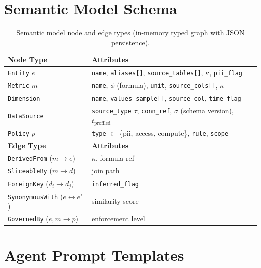\documentclass[11pt,a4paper]{article}
\begin{document}


\appendix

\section{Semantic Model Schema}\label{app:schema}

\begin{table}[H]
\centering
\caption{Semantic model node and edge types (in-memory typed graph with JSON persistence).}
\small
\begin{tabular}{lp{8cm}}
\toprule
\textbf{Node Type} & \textbf{Attributes} \\
\midrule
\texttt{Entity} $e$ & \texttt{name}, \texttt{aliases[]}, \texttt{source\_tables[]}, $\kappa$, \texttt{pii\_flag} \\
\texttt{Metric} $m$ & \texttt{name}, $\phi$ (formula), \texttt{unit}, \texttt{source\_cols[]}, $\kappa$ \\
\texttt{Dimension} & \texttt{name}, \texttt{values\_sample[]}, \texttt{source\_col}, \texttt{time\_flag} \\
\texttt{DataSource} & \texttt{source\_type} $\tau$, \texttt{conn\_ref}, $\sigma$ (schema version), $t_\mathrm{profiled}$ \\
\texttt{Policy} $p$ & \texttt{type} $\in$ \{pii, access, compute\}, \texttt{rule}, \texttt{scope} \\
\midrule
\textbf{Edge Type} & \textbf{Attributes} \\
\midrule
\texttt{DerivedFrom} ($m \to e$) & $\kappa$, formula ref \\
\texttt{SliceableBy} ($m \to d$) & join path \\
\texttt{ForeignKey} ($d_i \to d_j$) & \texttt{inferred\_flag} \\
\texttt{SynonymousWith} ($e \leftrightarrow e'$) & similarity score \\
\texttt{GovernedBy} ($e, m \to p$) & enforcement level \\
\bottomrule
\end{tabular}
\end{table}

\section{Agent Prompt Templates}\label{app:prompts}
\end{document}
